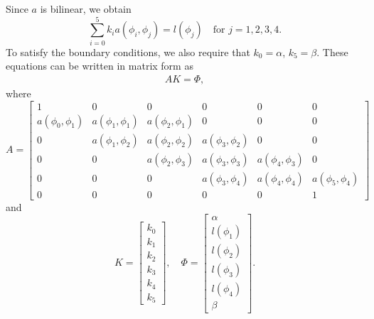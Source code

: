 Since $a$ is bilinear, we obtain 
\[\sum_{i=0}^5 k_i  a ( \phi_i,\phi_j ) = l(\phi_j) \quad \text{for } j = 1,2,3,4.\]
To satisfy the boundary conditions, we also require that $k_0 = \alpha$, $k_5 = \beta$.
These equations can be written in matrix form as
\begin{align} AK = \Phi,\label{eqn:FEM_linear_system}\end{align}
where
\[A = \left[\begin{array}{cccccc}1 & 0 & 0 & 0 & 0 & 0 \\a(\phi_0,\phi_1) & a(\phi_1,\phi_1) & a(\phi_2,\phi_1) & 0 & 0 & 0 \\0 & a(\phi_1,\phi_2) & a(\phi_2,\phi_2) & a(\phi_3,\phi_2) & 0 & 0 \\0 & 0 & a(\phi_2,\phi_3) & a(\phi_3,\phi_3) & a(\phi_4,\phi_3) & 0 \\0 & 0 & 0 & a(\phi_3,\phi_4) & a(\phi_4,\phi_4) & a(\phi_5,\phi_4) \\0 & 0 & 0 & 0 & 0 &1\end{array}\right]\]
and
\[K = \left[\begin{array}{c}k_0 \\k_1 \\k_2 \\k_3 \\k_4 \\k_5\end{array}\right] , \quad\Phi =  \left[\begin{array}{c}\alpha \\l(\phi_1) \\l(\phi_2) \\l(\phi_3) \\l(\phi_4) \\\beta\end{array}\right].\]

